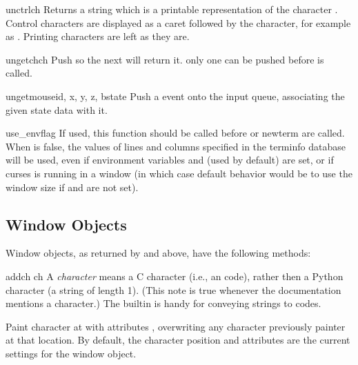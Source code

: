 \begin{funcdesc}{unctrl}{ch}
Returns a string which is a printable representation of the character
.  Control characters are displayed as a caret followed by the
character, for example as . Printing
characters are left as they are.
\end{funcdesc}

\begin{funcdesc}{ungetch}{ch}
Push  so the next  will return it.
 only one  can be pushed before 
is called.
\end{funcdesc}

\begin{funcdesc}{ungetmouse}{id, x, y, z, bstate}
Push a  event onto the input queue, associating
the given state data with it.
\end{funcdesc}

\begin{funcdesc}{use_env}{flag}
If used, this function should be called before  or
newterm are called.  When  is false, the values of
lines and columns specified in the terminfo database will be
used, even if environment variables  and
 (used by default) are set, or if curses is running in
a window (in which case default behavior would be to use the window
size if  and  are not set).
\end{funcdesc}

\subsection{Window Objects \label{curses-window-objects}}

Window objects, as returned by  and
 above, have the
following methods:

\begin{methoddesc}{addch}{ ch}
 A \emph{character} means a C character (i.e., an
\ASCII{} code), rather then a Python character (a string of length 1).
(This note is true whenever the documentation mentions a character.)
The builtin  is handy for conveying strings to codes.

Paint character  at  with attributes
, overwriting any character previously painter at that
location.  By default, the character position and attributes are the
current settings for the window object.
\end{methoddesc}

